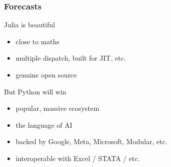 \documentclass[
    xcolor={svgnames,dvipsnames},
    hyperref={colorlinks, citecolor=DeepPink4, linkcolor=DarkRed, urlcolor=DarkBlue}
    ]{beamer}  %
\newcommand{\1}{\mathbbm 1}
\begin{document}
\begin{frame}
    \frametitle{Forecasts}

    Julia is beautiful
    \begin{itemize}
        \item close to maths
        \vspace{0.5em}
        \item multiple dispatch, built for JIT, etc.
        \vspace{0.5em}
        \item genuine open source
    \end{itemize}

    \pause

        \vspace{0.5em}
        \vspace{0.5em}
    But Python will win

    \begin{itemize}
        \item popular, massive ecosystem
        \vspace{0.5em}
        \item the language of AI
        \vspace{0.5em}
        \item backed by Google, Meta, Microsoft, Modular, etc.
        \vspace{0.5em}
        \item interoperable with Excel / STATA / etc.
    \end{itemize}


\end{frame}
\end{document}
